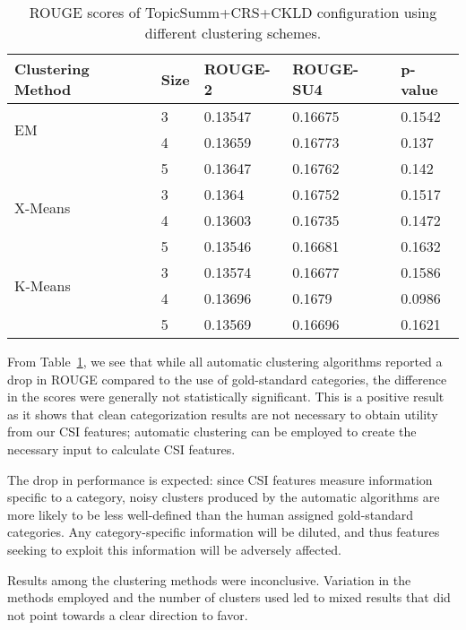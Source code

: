 \begin{table}[h]
\centering
\begin{tabular}{l||l|l|l|l}
Clustering Method & Size & ROUGE-2 & ROUGE-SU4 & p-value \\ \hline
\multirow{2}{*}{EM}
&3     			& 0.13547 & 0.16675 & 0.1542 \\
&4     			& 0.13659  & 0.16773 & 0.137 \\
&5             & 0.13647   & 0.16762  & 0.142\\
\hline
\multirow{2}{*}{X-Means}
&3              & 0.1364  & 0.16752 & 0.1517 \\
&4             & 0.13603   & 0.16735  & 0.1472 \\
&5             & 0.13546   & 0.16681  & 0.1632\\
\hline				
\multirow{2}{*}{K-Means}
&3              & 0.13574   & 0.16677 & 0.1586 \\
&4             & 0.13696  & 0.1679  & 0.0986\\
&5             & 0.13569  & 0.16696  & 0.1621\\
\end{tabular}
\caption{ROUGE scores of TopicSumm+CRS+CKLD configuration using different clustering schemes.}
\label{table:csi_clustering}
\end{table}

From Table~\ref{table:csi_clustering}, we see that while all automatic clustering algorithms reported a drop in ROUGE compared to the use of gold-standard categories, the difference in the scores were generally not statistically significant.  This is a positive result as it shows that clean categorization results are not necessary to obtain utility from our CSI features; automatic clustering can be employed to create the necessary input to calculate CSI features.

The drop in performance is expected: since CSI features measure information specific to a category, noisy clusters produced by the automatic algorithms are more likely to be less well-defined than the human assigned gold-standard categories. Any category-specific information will be diluted, and thus features seeking to exploit this information will be adversely affected.

Results among the clustering methods were inconclusive.  Variation in the methods employed and the number of clusters used led to mixed results that did not point towards a clear direction to favor. 

